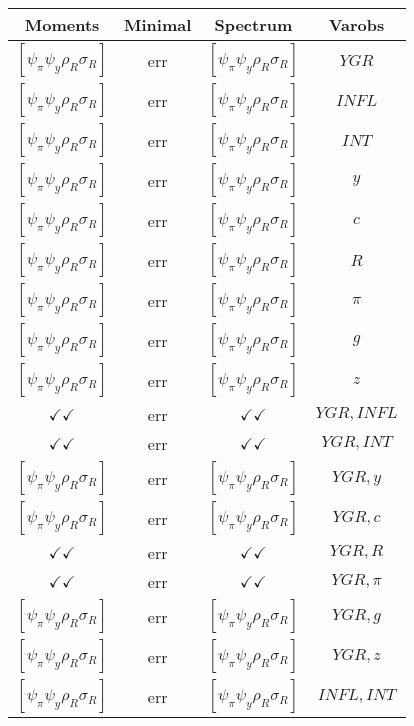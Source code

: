 \documentclass[a4paper,10pt]{article}
\begin{document}
\centering
\begin{longtable}{|c|c|c|c|}
\hline
Moments & Minimal & Spectrum & Varobs \\
\hline
$[\psi_\pi \psi_y \rho_R \sigma_R ]$ & err & $[\psi_\pi \psi_y \rho_R \sigma_R ]$ & ${YGR}$ \\
\hline
$[\psi_\pi \psi_y \rho_R \sigma_R ]$ & err & $[\psi_\pi \psi_y \rho_R \sigma_R ]$ & ${INFL}$ \\
\hline
$[\psi_\pi \psi_y \rho_R \sigma_R ]$ & err & $[\psi_\pi \psi_y \rho_R \sigma_R ]$ & ${INT}$ \\
\hline
$[\psi_\pi \psi_y \rho_R \sigma_R ]$ & err & $[\psi_\pi \psi_y \rho_R \sigma_R ]$ & ${y}$ \\
\hline
$[\psi_\pi \psi_y \rho_R \sigma_R ]$ & err & $[\psi_\pi \psi_y \rho_R \sigma_R ]$ & ${c}$ \\
\hline
$[\psi_\pi \psi_y \rho_R \sigma_R ]$ & err & $[\psi_\pi \psi_y \rho_R \sigma_R ]$ & ${R}$ \\
\hline
$[\psi_\pi \psi_y \rho_R \sigma_R ]$ & err & $[\psi_\pi \psi_y \rho_R \sigma_R ]$ & ${\pi}$ \\
\hline
$[\psi_\pi \psi_y \rho_R \sigma_R ]$ & err & $[\psi_\pi \psi_y \rho_R \sigma_R ]$ & ${g}$ \\
\hline
$[\psi_\pi \psi_y \rho_R \sigma_R ]$ & err & $[\psi_\pi \psi_y \rho_R \sigma_R ]$ & ${z}$ \\
\hline
$\checkmark\checkmark$ & err & $\checkmark\checkmark$ & ${YGR},{INFL}$ \\
\hline
$\checkmark\checkmark$ & err & $\checkmark\checkmark$ & ${YGR},{INT}$ \\
\hline
$[\psi_\pi \psi_y \rho_R \sigma_R ]$ & err & $[\psi_\pi \psi_y \rho_R \sigma_R ]$ & ${YGR},{y}$ \\
\hline
$[\psi_\pi \psi_y \rho_R \sigma_R ]$ & err & $[\psi_\pi \psi_y \rho_R \sigma_R ]$ & ${YGR},{c}$ \\
\hline
$\checkmark\checkmark$ & err & $\checkmark\checkmark$ & ${YGR},{R}$ \\
\hline
$\checkmark\checkmark$ & err & $\checkmark\checkmark$ & ${YGR},{\pi}$ \\
\hline
$[\psi_\pi \psi_y \rho_R \sigma_R ]$ & err & $[\psi_\pi \psi_y \rho_R \sigma_R ]$ & ${YGR},{g}$ \\
\hline
$[\psi_\pi \psi_y \rho_R \sigma_R ]$ & err & $[\psi_\pi \psi_y \rho_R \sigma_R ]$ & ${YGR},{z}$ \\
\hline
$[\psi_\pi \psi_y \rho_R \sigma_R ]$ & err & $[\psi_\pi \psi_y \rho_R \sigma_R ]$ & ${INFL},{INT}$ \\

\end{longtable}
\end{document}
